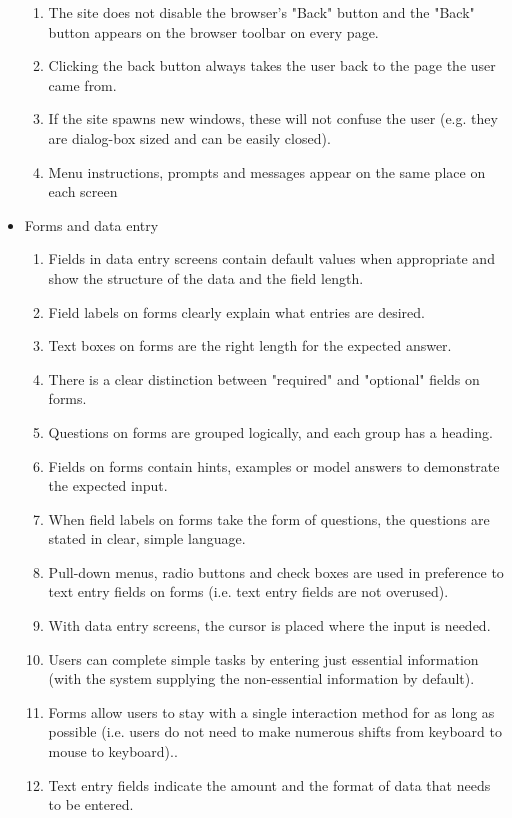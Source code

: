 \begin{itemize}
\begin{enumerate}
        \item The site does not disable the browser's "Back" button and the "Back" button appears on the browser toolbar on every page.
        \item Clicking the back button always takes the user back to the page the user came from.
        \item If the site spawns new windows, these will not confuse the user (e.g. they are dialog-box sized and can be easily closed).
        \item Menu instructions, prompts and messages appear on the same place on each screen
      \end{enumerate}
  \item Forms and data entry
      \begin{enumerate}
        \item Fields in data entry screens contain default values when appropriate and show the structure of the data and the field length.
        \item Field labels on forms clearly explain what entries are desired.
        \item Text boxes on forms are the right length for the expected answer.
        \item There is a clear distinction between "required" and "optional" fields on forms.
        \item Questions on forms are grouped logically, and each group has a heading.
        \item Fields on forms contain hints, examples or model answers to demonstrate the expected input.
        \item When field labels on forms take the form of questions, the questions are stated in clear, simple language.
        \item Pull-down menus, radio buttons and check boxes are used in preference to text entry fields on forms (i.e. text entry fields are not overused).
        \item With data entry screens, the cursor is placed where the input is needed.
        \item Users can complete simple tasks by entering just essential information (with the system supplying the non-essential information by default).
        \item Forms allow users to stay with a single interaction method for as long as possible (i.e. users do not need to make numerous shifts from keyboard to mouse to keyboard)..
        \item Text entry fields indicate the amount and the format of data that needs to be entered.

\end{enumerate}
\end{itemize}
